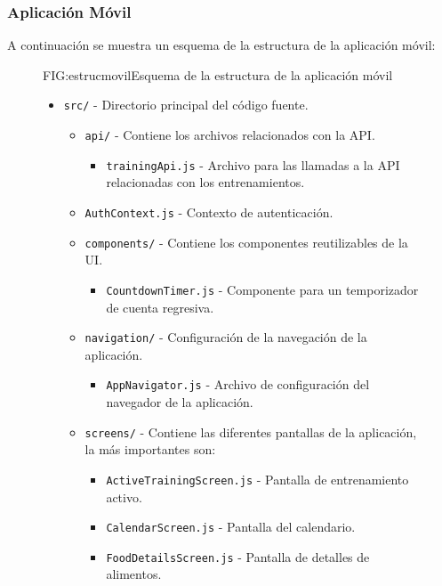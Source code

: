 \subsubsection{Aplicación Móvil}

A continuación se muestra un esquema de la estructura de la aplicación móvil:

\begin{figure}[Estructura de aplicación móvil]{FIG:estrucmovil}{Esquema de la estructura de la aplicación móvil}
    \begin{itemize}
        \item \texttt{src/} - Directorio principal del código fuente.
        \begin{itemize}
            \item \texttt{api/} - Contiene los archivos relacionados con la API.
            \begin{itemize}
                \item \texttt{trainingApi.js} - Archivo para las llamadas a la API relacionadas con los entrenamientos.
            \end{itemize}
            \item \texttt{AuthContext.js} - Contexto de autenticación.
            \item \texttt{components/} - Contiene los componentes reutilizables de la UI.
            \begin{itemize}
                \item \texttt{CountdownTimer.js} - Componente para un temporizador de cuenta regresiva.
            \end{itemize}
            \item \texttt{navigation/} - Configuración de la navegación de la aplicación.
            \begin{itemize}
                \item \texttt{AppNavigator.js} - Archivo de configuración del navegador de la aplicación.
            \end{itemize}
            \item \texttt{screens/} - Contiene las diferentes pantallas de la aplicación, la más importantes son:
            \begin{itemize}
                \item \texttt{ActiveTrainingScreen.js} - Pantalla de entrenamiento activo.
                \item \texttt{CalendarScreen.js} - Pantalla del calendario.
                \item \texttt{FoodDetailsScreen.js} - Pantalla de detalles de alimentos.

\end{itemize}
\end{itemize}
\end{itemize}
\end{figure}

